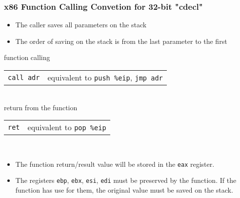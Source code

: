 \documentclass{beamer}
\begin{document}
\begin{frame}
\frametitle{x86 Function Calling Convetion for 32-bit "cdecl"}

\begin{itemize}
\item The caller saves all parameters on the stack
\item The order of saving on the stack is from the last parameter to the first
\end{itemize}

\bigskip

function calling\\
\begin{tabular}{ l l}
\texttt{call adr} &         equivalent to \texttt{push \%eip}, \texttt{jmp adr}\\
\end{tabular}\\
return from the function\\
\begin{tabular}{ l l}
\texttt{ret} &              equivalent to \texttt{pop \%eip}\\
\end{tabular}\\
\bigskip

\begin{itemize}
\item The function return/result value will be stored in the \texttt{eax} register.
\item The registers \texttt{ebp}, \texttt{ebx}, \texttt{esi}, \texttt{edi} must be preserved by the function. If the function has use for them, the original value must be saved on the stack.
\end{itemize}

\end{frame}
\end{document}
